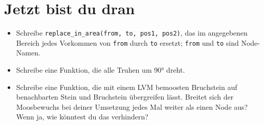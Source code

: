 \begin{Shaded}
\begin{Highlighting}[]
    \OperatorTok{:}\OperatorTok{(}\OperatorTok{)}
    \OperatorTok{:}\OperatorTok{(}\OperatorTok{)}
\end{Highlighting}
\end{Shaded}

\section{Jetzt bist du dran}\label{jetzt-bist-du-dran}

\begin{itemize}
\tightlist
\item
  Schreibe
  \texttt{replace\_\allowbreak{}in\_\allowbreak{}area(from, to, pos1, pos2)},
  das im angegebenen Bereich jedes Vorkommen von \texttt{from} durch
  \texttt{to} ersetzt; \texttt{from} und \texttt{to} sind Node-Namen.
\item
  Schreibe eine Funktion, die alle Truhen um 90° dreht.
\item
  Schreibe eine Funktion, die mit einem LVM bemoosten Bruchstein auf
  benachbarten Stein und Bruchstein übergreifen lässt. Breitet sich der
  Moosbewuchs bei deiner Umsetzung jedes Mal weiter als einen Node aus?
  Wenn ja, wie könntest du das verhindern?
\end{itemize}
